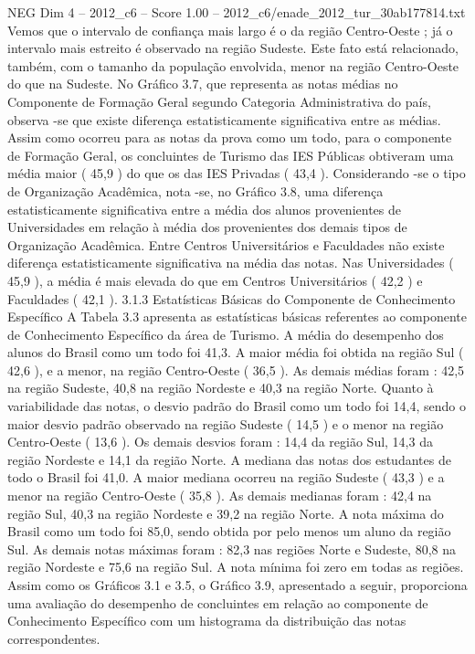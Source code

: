 \begin{textsample}{NEG Dim 4 – 2012\_c6 – Score 1.00 – 2012\_c6/enade\_2012\_tur\_30ab177814.txt}
Vemos que o intervalo de confiança mais largo é o da região Centro-Oeste ; já o intervalo mais estreito é observado na região Sudeste.
Este fato está relacionado, também, com o tamanho da população envolvida, menor na região Centro-Oeste do que na Sudeste.
No Gráfico 3.7, que representa as notas médias no Componente de Formação Geral segundo Categoria Administrativa do país, observa -se que existe diferença estatisticamente significativa entre as médias.
Assim como ocorreu para as notas da prova como um todo, para o componente de Formação Geral, os concluintes de Turismo das IES Públicas obtiveram uma média maior ( 45,9 ) do que os das IES Privadas ( 43,4 ).
Considerando -se o tipo de Organização Acadêmica, nota -se, no Gráfico 3.8, uma diferença estatisticamente significativa entre a média dos alunos provenientes de Universidades em relação à média dos provenientes dos demais tipos de Organização Acadêmica.
Entre Centros Universitários e Faculdades não existe diferença estatisticamente significativa na média das notas.
Nas Universidades ( 45,9 ), a média é mais elevada do que em Centros Universitários ( 42,2 ) e Faculdades ( 42,1 ). 3.1.3 Estatísticas Básicas do Componente de Conhecimento Específico A Tabela 3.3 apresenta as estatísticas básicas referentes ao componente de Conhecimento Específico da área de Turismo.
A média do desempenho dos alunos do Brasil como um todo foi 41,3.
A maior média foi obtida na região Sul ( 42,6 ), e a menor, na região Centro-Oeste ( 36,5 ).
As demais médias foram : 42,5 na região Sudeste, 40,8 na região Nordeste e 40,3 na região Norte.
Quanto à variabilidade das notas, o desvio padrão do Brasil como um todo foi 14,4, sendo o maior desvio padrão observado na região Sudeste ( 14,5 ) e o menor na região Centro-Oeste ( 13,6 ).
Os demais desvios foram : 14,4 da região Sul, 14,3 da região Nordeste e 14,1 da região Norte.
A mediana das notas dos estudantes de todo o Brasil foi 41,0.
A maior mediana ocorreu na região Sudeste ( 43,3 ) e a menor na região Centro-Oeste ( 35,8 ).
As demais medianas foram : 42,4 na região Sul, 40,3 na região Nordeste e 39,2 na região Norte.
A nota máxima do Brasil como um todo foi 85,0, sendo obtida por pelo menos um aluno da região Sul.
As demais notas máximas foram : 82,3 nas regiões Norte e Sudeste, 80,8 na região Nordeste e 75,6 na região Sul.
A nota mínima foi zero em todas as regiões.
Assim como os Gráficos 3.1 e 3.5, o Gráfico 3.9, apresentado a seguir, proporciona uma avaliação do desempenho de concluintes em relação ao componente de Conhecimento Específico com um histograma da distribuição das notas correspondentes.

\end{textsample}
